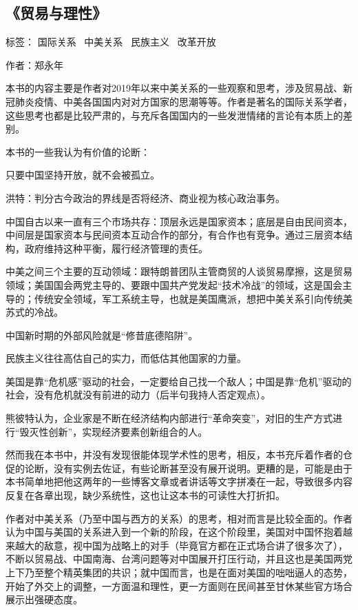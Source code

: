 \subsection{《贸易与理性》}

标签： 国际关系 \ 中美关系 \ 民族主义 \ 改革开放

作者：郑永年

本书的内容主要是作者对2019年以来中美关系的一些观察和思考，涉及贸易战、新冠肺炎疫情、中美各国国内对对方国家的思潮等等。作者是著名的国际关系学者，这些思考也都是比较严肃的，与充斥各国国内的一些发泄情绪的言论有本质上的差别。

本书的一些我认为有价值的论断：
\begin{itemize*}
    \item 只要中国坚持开放，就不会被孤立。
    \item 洪特：判分古今政治的界线是否将经济、商业视为核心政治事务。
    \item 中国自古以来一直有三个市场共存：顶层永远是国家资本；底层是自由民间资本，中间层是国家资本与民间资本互动合作的部分，有合作也有竞争。通过三层资本结构，政府维持这种平衡，履行经济管理的责任。
    \item 中美之间三个主要的互动领域：跟特朗普团队主管商贸的人谈贸易摩擦，这是贸易领域；美国国会两党主导的、要跟中国共产党发起“技术冷战”的领域，这是国会主导的；传统安全领域，军工系统主导，也就是美国鹰派，想把中美关系引向传统美苏式的冷战。
    \item 中国新时期的外部风险就是“修昔底德陷阱”。
    \item 民族主义往往高估自己的实力，而低估其他国家的力量。
    \item 美国是靠“危机感”驱动的社会，一定要给自己找一个敌人；中国是靠“危机”驱动的社会，没有危机就没有前进的动力（后半句我持人否定观点）。
    \item 熊彼特认为，企业家是不断在经济结构内部进行“革命突变”，对旧的生产方式进行“毁灭性创新”，实现经济要素创新组合的人。
\end{itemize*}

然而我在本书中，并没有发现很能体现学术性的思考，相反，本书充斥着作者的仓促的论断，没有实例去佐证，有些论断甚至没有展开说明。更糟的是，可能是由于本书简单地把他这两年的一些博客文章或者讲话等文字拼凑在一起，导致很多内容反复在各章出现，缺少系统性，这也让这本书的可读性大打折扣。

作者对中美关系（乃至中国与西方的关系）的思考，相对而言是比较全面的。作者认为中国与美国的关系进入到一个新的阶段，在这个阶段里，美国对中国怀抱着越来越大的敌意，视中国为战略上的对手（毕竟官方都在正式场合讲了很多次了），不断以贸易战、中国南海、台湾问题等对中国展开打压行动，并且这也是美国两党上下乃至整个精英集团的共识；就中国而言，也是在面对美国的咄咄逼人的态势，开始了外交上的调整，一方面温和理性，更一方面则在民间甚至甘休某些官方场合展示出强硬态度。

